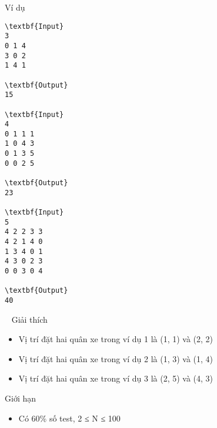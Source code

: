 Ví dụ
\begin{verbatim}
\textbf{Input}
3
0 1 4
3 0 2
1 4 1

\textbf{Output}
15

\textbf{Input}
4
0 1 1 1
1 0 4 3
0 1 3 5
0 0 2 5

\textbf{Output}
23

\textbf{Input}
5
4 2 2 3 3
4 2 1 4 0
1 3 4 0 1
4 3 0 2 3
0 0 3 0 4

\textbf{Output}
40\end{verbatim}

 
Giải thích
\begin{itemize}
	\item Vị trí đặt hai quân xe trong ví dụ 1 là (1, 1) và (2, 2)
	\item Vị trí đặt hai quân xe trong ví dụ 2 là (1, 3) và (1, 4)
	\item Vị trí đặt hai quân xe trong ví dụ 3 là (2, 5) và (4, 3)
\end{itemize}
Giới hạn
\begin{itemize}
	\item Có 60\% số test, 2 ≤ N ≤ 100
\end{itemize}
